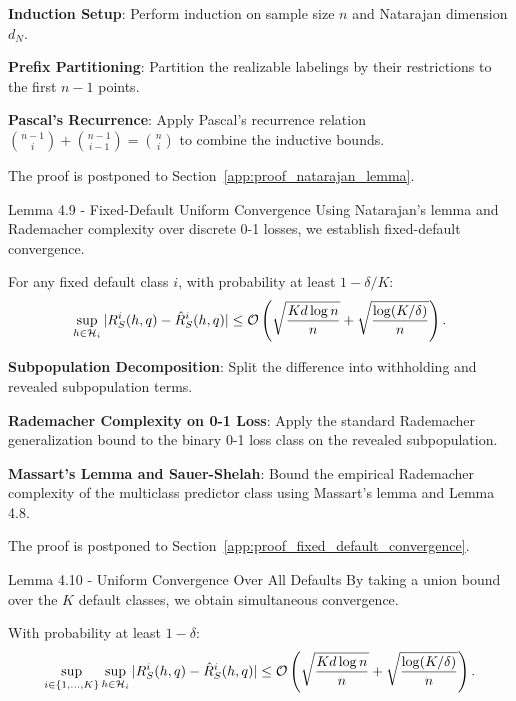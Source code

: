 \begin{guideblock}
\item \textbf{Induction Setup}: Perform induction on sample size $n$ and Natarajan dimension $d_N$.
\item \textbf{Prefix Partitioning}: Partition the realizable labelings by their restrictions to the first $n-1$ points.
\item \textbf{Pascal's Recurrence}: Apply Pascal's recurrence relation $\binom{n-1}{i} + \binom{n-1}{i-1} = \binom{n}{i}$ to combine the inductive bounds.
\end{guideblock}
The proof is postponed to Section~\ref{app:proof_natarajan_lemma}.

\begin{sourceblock}{Lemma 4.9 - Fixed-Default Uniform Convergence}
Using Natarajan's lemma and Rademacher complexity over discrete 0-1 losses, we establish fixed-default convergence.
\begin{lemma}
\label{lem:fixed_default_convergence}
For any fixed default class $i$, with probability at least $1 - \delta/K$:
\begin{equation}
    \label{eq:fixed_default_bound}
    \sup_{h \in \mathcal{H}_i} |R^i_S(h, q) - \hat{R}^i_S(h, q)| \le \mathcal{O}\left( \sqrt{\frac{K d \log n}{n}} + \sqrt{\frac{\log(K/\delta)}{n}} \right).
\end{equation}
\end{lemma}
\end{sourceblock}

\begin{guideblock}
\item \textbf{Subpopulation Decomposition}: Split the difference into withholding and revealed subpopulation terms.
\item \textbf{Rademacher Complexity on 0-1 Loss}: Apply the standard Rademacher generalization bound to the binary 0-1 loss class on the revealed subpopulation.
\item \textbf{Massart's Lemma and Sauer-Shelah}: Bound the empirical Rademacher complexity of the multiclass predictor class using Massart's lemma and Lemma 4.8.
\end{guideblock}
The proof is postponed to Section~\ref{app:proof_fixed_default_convergence}.

\begin{sourceblock}{Lemma 4.10 - Uniform Convergence Over All Defaults}
By taking a union bound over the $K$ default classes, we obtain simultaneous convergence.
\begin{lemma}
\label{lem:simultaneous_convergence}
With probability at least $1 - \delta$:
\begin{equation}
    \label{eq:simultaneous_bound}
    \sup_{i \in \{1, \dots, K\}} \sup_{h \in \mathcal{H}_i} |R^i_S(h, q) - \hat{R}^i_S(h, q)| \le \mathcal{O}\left( \sqrt{\frac{K d \log n}{n}} + \sqrt{\frac{\log(K/\delta)}{n}} \right).
\end{equation}
\end{lemma}
\end{sourceblock}

